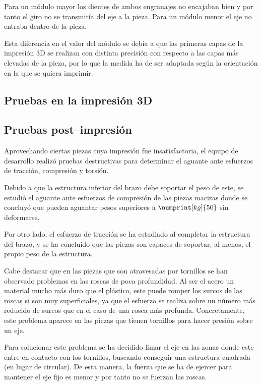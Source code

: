 Para un módulo mayor los dientes de ambos engranajes no encajaban bien y por tanto el giro no se transmitía del eje a la pieza. Para un módulo menor el eje no entraba dentro de la pieza.

Esta diferencia en el valor del módulo se debía a que las primeras capas de la impresión
3D se realizan con distinta precisión con respecto a las capas más elevadas de la
pieza, por lo que la medida ha de ser adaptada según la orientación en la que se quiera
imprimir.

\subsection{Pruebas en la impresión 3D}


\subsection{Pruebas post--impresión}
\label{pruebas_post_impresión}

Aprovechando ciertas piezas cuya impresión fue insatisfactoria, el equipo de desarrollo realizó pruebas destructivas para determinar el aguante ante esfuerzos de tracción, compresión y torsión.

Debido a que la estructura inferior del brazo debe soportar el peso de este, se estudió el aguante ante esfuerzos de compresión de las piezas macizas donde se concluyó que pueden aguantar pesos superiores a $\numprint[kg]{50}$ sin deformarse.

Por otro lado, el esfuerzo de tracción se ha estudiado al completar la estructura del brazo, y se ha concluido que las piezas son capaces de soportar, al menos, el propio peso de la estructura.


Cabe destacar que en las piezas que son atravesadas por tornillos se han observado problemas en las roscas de poca profundidad. Al ser el acero un material mucho más duro que el plástico, este puede romper los surcos de las roscas si son muy superficiales, ya que el esfuerzo se realiza sobre un número más reducido de surcos que en el caso de una rosca más profunda. 
Concretamente, este problema aparece en las piezas que tienen tornillos para hacer presión sobre un eje.

Para solucionar este problema se ha decidido limar el eje en las zonas donde este entre en contacto con los tornillos, buscando conseguir una estructura cuadrada (en lugar de circular). De esta manera, la fuerza que se ha de ejercer para mantener el eje fijo es menor y por tanto no se fuerzan las roscas.